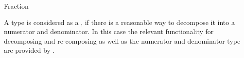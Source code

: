 \begin{ccRefConcept}{Fraction}

\ccDefinition

A type is considered as a , if there is a reasonable way to 
decompose it into a numerator and denominator. In this case the relevant 
functionality for decomposing and re-composing as well as the numerator and 
denominator type are provided by .
  
\ccSeeAlso
{}\\
\\

\end{ccRefConcept}